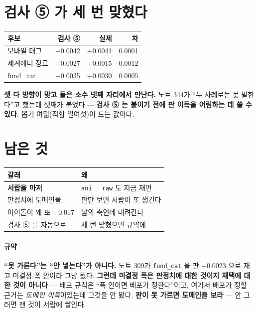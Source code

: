 \documentclass[10pt]{article}
\begin{document}
\section{검사 ⑤ 가 세 번 맞혔다}

\begin{center}\footnotesize
\begin{tabular}{lrrr}
\hline
후보 & 검사 ⑤ & 실제 & 차 \\
\hline
모바일 태그 & $+$0.0042 & $+$0.0041 & 0.0001 \\
세계애니 장르 & $+$0.0027 & $+$0.0015 & 0.0012 \\
fund\_cat & $+$0.0035 & $+$0.0030 & 0.0005 \\
\hline
\end{tabular}
\end{center}

\textbf{셋 다 방향이 맞고 둘은 소수 넷째 자리에서 만난다.} 노트 344가
``두 사례로는 못 말한다''고 했는데 셋째가 붙었다 --- \textbf{검사 ⑤ 는
붙이기 전에 판 이득을 어림하는 데 쓸 수 있다.} 뽑기 여덟(적합 열여섯)이
드는 값이다.

\section{남은 것}
\begin{center}\footnotesize
\begin{tabular}{ll}
\hline
갈래 & 왜 \\
\hline
\textbf{서랍을 마저} & \texttt{ani} · \texttt{raw} 도 지금 재면 \\
판정치에 도메인을 & 판만 보면 서랍이 또 생긴다 \\
아이돌이 왜 또 $-$0.017 & 남의 축인데 내려간다 \\
검사 ⑤ 를 자동으로 & 세 번 맞혔으면 규약에 \\
\hline
\end{tabular}
\end{center}

\paragraph{규약} \textbf{``못 가른다''는 ``안 넣는다''가 아니다.} 노트 309가
\texttt{fund\_cat} 을 판 $+$0.0023 으로 재고 미결정 폭 안이라 그냥 뒀다.
\textbf{그런데 미결정 폭은 판정치에 대한 것이지 채택에 대한 것이 아니다}
--- 배포 규칙은 ``폭 안이면 배포가 정한다''이고, 여기서 배포가 정할 근거는
\emph{도메인 이득}이었는데 그것을 안 봤다. \textbf{판이 못 가르면 도메인을
보라} --- 안 그러면 잰 것이 서랍에 쌓인다.
\end{document}
